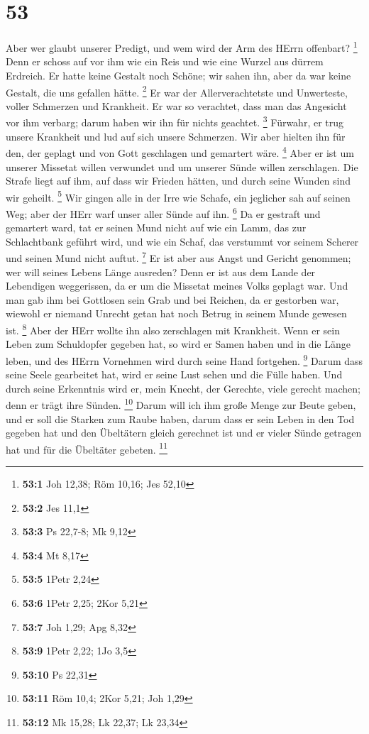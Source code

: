 \hypertarget{section-19}{%
\section{53}\label{section-19}}

 Aber wer glaubt unserer Predigt, und wem wird der Arm des
HErrn offenbart? \footnote{\textbf{53:1} Joh 12,38; Röm 10,16; Jes 52,10}
 Denn er schoss auf vor ihm wie ein Reis und wie eine Wurzel
aus dürrem Erdreich. Er hatte keine Gestalt noch Schöne; wir sahen ihn,
aber da war keine Gestalt, die uns gefallen hätte. \footnote{\textbf{53:2}
  Jes 11,1}  Er war der Allerverachtetste und Unwerteste,
voller Schmerzen und Krankheit. Er war so verachtet, dass man das
Angesicht vor ihm verbarg; darum haben wir ihn für nichts geachtet.
\footnote{\textbf{53:3} Ps 22,7-8; Mk 9,12}  Fürwahr, er
trug unsere Krankheit und lud auf sich unsere Schmerzen. Wir aber
hielten ihn für den, der geplagt und von Gott geschlagen und gemartert
wäre. \footnote{\textbf{53:4} Mt 8,17}  Aber er ist um
unserer Missetat willen verwundet und um unserer Sünde willen
zerschlagen. Die Strafe liegt auf ihm, auf dass wir Frieden hätten, und
durch seine Wunden sind wir geheilt. \footnote{\textbf{53:5} 1Petr 2,24}
 Wir gingen alle in der Irre wie Schafe, ein jeglicher sah
auf seinen Weg; aber der HErr warf unser aller Sünde auf ihn.
\footnote{\textbf{53:6} 1Petr 2,25; 2Kor 5,21}  Da er
gestraft und gemartert ward, tat er seinen Mund nicht auf wie ein Lamm,
das zur Schlachtbank geführt wird, und wie ein Schaf, das verstummt vor
seinem Scherer und seinen Mund nicht auftut. \footnote{\textbf{53:7} Joh
  1,29; Apg 8,32}  Er ist aber aus Angst und Gericht
genommen; wer will seines Lebens Länge ausreden? Denn er ist aus dem
Lande der Lebendigen weggerissen, da er um die Missetat meines Volks
geplagt war.  Und man gab ihm bei Gottlosen sein Grab und
bei Reichen, da er gestorben war, wiewohl er niemand Unrecht getan hat
noch Betrug in seinem Munde gewesen ist. \footnote{\textbf{53:9} 1Petr
  2,22; 1Jo 3,5}  Aber der HErr wollte ihn also zerschlagen
mit Krankheit. Wenn er sein Leben zum Schuldopfer gegeben hat, so wird
er Samen haben und in die Länge leben, und des HErrn Vornehmen wird
durch seine Hand fortgehen. \footnote{\textbf{53:10} Ps 22,31}
 Darum dass seine Seele gearbeitet hat, wird er seine Lust
sehen und die Fülle haben. Und durch seine Erkenntnis wird er, mein
Knecht, der Gerechte, viele gerecht machen; denn er trägt ihre Sünden.
\footnote{\textbf{53:11} Röm 10,4; 2Kor 5,21; Joh 1,29} 
Darum will ich ihm große Menge zur Beute geben, und er soll die Starken
zum Raube haben, darum dass er sein Leben in den Tod gegeben hat und den
Übeltätern gleich gerechnet ist und er vieler Sünde getragen hat und für
die Übeltäter gebeten. \footnote{\textbf{53:12} Mk 15,28; Lk 22,37; Lk
  23,34}

